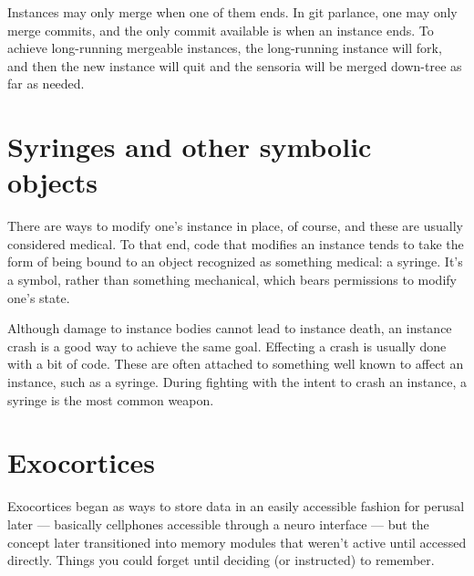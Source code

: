 Instances may only merge when one of them ends. In git parlance, one may only merge commits, and the only commit available is when an instance ends. To achieve long-running mergeable instances, the long-running instance will fork, and then the new instance will quit and the sensoria will be merged down-tree as far as needed.

\hypertarget{syringes-and-other-symbolic-objects}{%
\section*{Syringes and other symbolic objects}\label{syringes-and-other-symbolic-objects}}

There are ways to modify one's instance in place, of course, and these are usually considered medical. To that end, code that modifies an instance tends to take the form of being bound to an object recognized as something medical: a syringe. It's a symbol, rather than something mechanical, which bears permissions to modify one's state.

Although damage to instance bodies cannot lead to instance death, an instance crash is a good way to achieve the same goal. Effecting a crash is usually done with a bit of code. These are often attached to something well known to affect an instance, such as a syringe. During fighting with the intent to crash an instance, a syringe is the most common weapon.

\hypertarget{exocortices}{%
\section*{Exocortices}\label{exocortices}}

Exocortices began as ways to store data in an easily accessible fashion for perusal later --- basically cellphones accessible through a neuro interface --- but the concept later transitioned into memory modules that weren't active until accessed directly. Things you could forget until deciding (or instructed) to remember.
